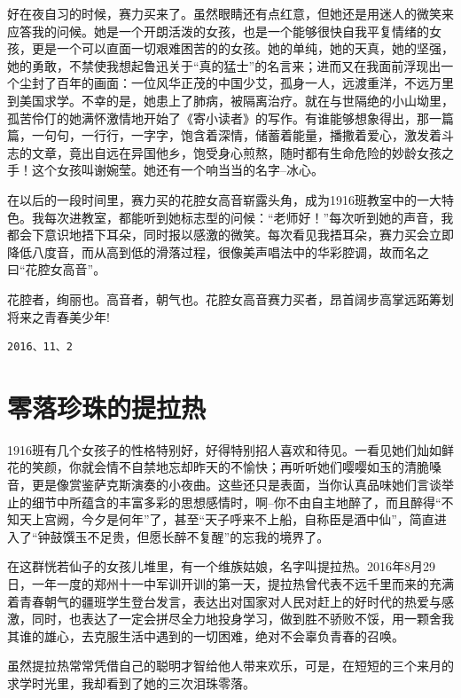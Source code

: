 \documentclass[openany]{ctexbook}
\begin{document}
好在夜自习的时候，赛力买来了。虽然眼睛还有点红意，但她还是用迷人的微笑来应答我的问候。她是一个开朗活泼的女孩，也是一个能够很快自我平复情绪的女孩，更是一个可以直面一切艰难困苦的的女孩。她的单纯，她的天真，她的坚强，她的勇敢，不禁使我想起鲁迅关于``真的猛士''的名言来；进而又在我面前浮现出一个尘封了百年的画面：一位风华正茂的中国少艾，孤身一人，远渡重洋，不远万里到美国求学。不幸的是，她患上了肺病，被隔离治疗。就在与世隔绝的小山坳里，孤苦伶仃的她满怀激情地开始了《寄小读者》的写作。有谁能够想象得出，那一篇篇，一句句，一行行，一字字，饱含着深情，储蓄着能量，播撒着爱心，激发着斗志的文章，竟出自远在异国他乡，饱受身心煎熬，随时都有生命危险的妙龄女孩之手！这个女孩叫谢婉莹。她还有一个响当当的名字--冰心。

在以后的一段时间里，赛力买的花腔女高音崭露头角，成为1916班教室中的一大特色。我每次进教室，都能听到她标志型的问候：``老师好！''每次听到她的声音，我都会下意识地捂下耳朵，同时报以感激的微笑。每次看见我捂耳朵，赛力买会立即降低八度音，而从高到低的滑落过程，很像美声唱法中的华彩腔调，故而名之曰``花腔女高音''。

花腔者，绚丽也。高音者，朝气也。花腔女高音赛力买者，昂首阔步高掌远跖筹划将来之青春美少年!

\begin{verbatim}
2016、11、2
\end{verbatim}

\chapter*{零落珍珠的提拉热}\label{tilare}

1916班有几个女孩子的性格特别好，好得特别招人喜欢和待见。一看见她们灿如鲜花的笑颜，你就会情不自禁地忘却昨天的不愉快；再听听她们嘤嘤如玉的清脆嗓音，更是像赏鉴萨克斯演奏的小夜曲。这些还只是表面，当你认真品味她们言谈举止的细节中所蕴含的丰富多彩的思想感情时，啊--你不由自主地醉了，而且醉得``不知天上宫阙，今夕是何年''了，甚至``天子呼来不上船，自称臣是酒中仙''，简直进入了``钟鼓馔玉不足贵，但愿长醉不复醒''的忘我的境界了。

在这群恍若仙子的女孩儿堆里，有一个维族姑娘，名字叫提拉热。2016年8月29日，一年一度的郑州十一中军训开训的第一天，提拉热曾代表不远千里而来的充满着青春朝气的疆班学生登台发言，表达出对国家对人民对赶上的好时代的热爱与感激，同时，也表达了一定会拼尽全力地投身学习，做到胜不骄败不馁，用一颗舍我其谁的雄心，去克服生活中遇到的一切困难，绝对不会辜负青春的召唤。

虽然提拉热常常凭借自己的聪明才智给他人带来欢乐，可是，在短短的三个来月的求学时光里，我却看到了她的三次泪珠零落。
\end{document}
